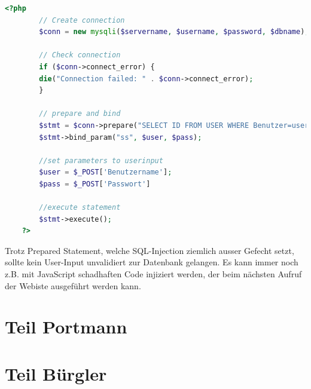 \documentclass[a4paper, 11pt, nofootinbib]{article}
\begin{document}
\begin{lstlisting}[language=php, captionpos=b, caption={Prepared Statement in PHP}]
	<?php
		// Create connection
		$conn = new mysqli($servername, $username, $password, $dbname);
		
		// Check connection
		if ($conn->connect_error) {
		die("Connection failed: " . $conn->connect_error);
		}
		
		// prepare and bind
		$stmt = $conn->prepare("SELECT ID FROM USER WHERE Benutzer=user AND Password=pass) VALUES (?, ?)");
		$stmt->bind_param("ss", $user, $pass);
		
		//set parameters to userinput
		$user = $_POST['Benutzername'];
		$pass = $_POST['Passwort']
		
		//execute statement
		$stmt->execute();
	?>
\end{lstlisting}

\vspace{10px}

\noindent Trotz Prepared Statement, welche SQL-Injection ziemlich ausser Gefecht setzt, sollte kein User-Input unvalidiert zur Datenbank gelangen. Es kann immer noch z.B. mit JavaScript schadhaften Code injiziert werden, der beim nächsten Aufruf der Webiste ausgeführt werden kann.

\section{Teil Portmann}

\section{Teil Bürgler}
\end{document}
